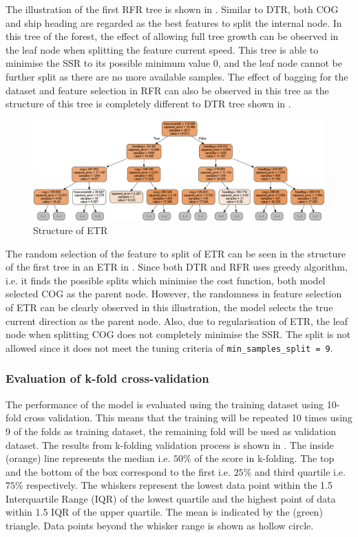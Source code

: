 The illustration of the first RFR tree is shown in . Similar to DTR, both COG and ship heading are regarded as the best features to split the internal node. In this tree of the forest, the effect of allowing full tree growth can be observed in the leaf node when splitting the feature current speed. This tree is able to minimise the SSR to its possible minimum value 0, and the leaf node cannot be further split as there are no more available samples. The effect of bagging for the dataset and feature selection in RFR can also be observed in this tree as the structure of this tree is completely different to DTR tree shown in .\\

\begin{figure}[h]
    \centering
        \includegraphics[width=.9\textwidth]{02_figures/etr_mod_it1.png}
        \caption{Structure of ETR}
        \label{fig:etr_tree1_etr}
\end{figure}
The random selection of the feature to split of ETR can be seen in the structure of the first tree in an ETR in . Since both DTR and RFR uses greedy algorithm, i.e. it finds the possible splits which minimise the cost function, both model selected COG as the parent node. However, the randomness in feature selection of ETR can be clearly observed in this illustration, the model selects the true current direction as the parent node. Also, due to regularisation of ETR, the leaf node when splitting COG does not completely minimise the SSR. The split is not allowed since it does not meet the tuning criteria of {\tt min\_samples\_split = 9}.\\ 

\subsubsection*{Evaluation of k-fold cross-validation}

The performance of the model is evaluated using the training dataset using 10-fold cross validation. This means that the training will be repeated 10 times using 9 of the folds as training dataset, the remaining fold will be used as validation dataset. The results from k-folding validation process is shown in . The inside (orange) line represents the median i.e. $50\%$ of the score in k-folding. The top and the bottom of the box correspond to the first i.e. $25\%$ and third quartile i.e. $75\%$ respectively. The whiskers represent the lowest data point within the 1.5 Interquartile Range (IQR) of the lowest quartile and the highest point of data within 1.5 IQR of the upper quartile. The mean is indicated by the (green) triangle. Data points beyond the whisker range is shown as hollow circle.\\

